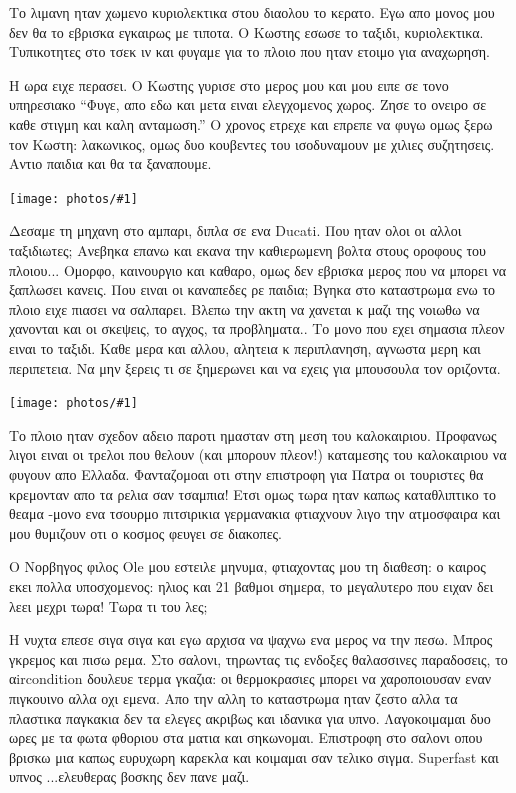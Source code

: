 \documentclass[11pt, letterpaper]{book}
\newcommand\photo[1]{\begin{center}\noindent\texttt{[image: photos/\#1]}\end{center}}
\begin{document}
Το λιμανη ηταν χωμενο κυριολεκτικα στου διαολου το κερατο. Εγω απο μονος μου δεν θα το εβρισκα εγκαιρως με τιποτα. Ο Κωστης εσωσε το ταξιδι, κυριολεκτικα. Τυπικοτητες στο τσεκ ιν και φυγαμε για το πλοιο που ηταν ετοιμο για αναχωρηση.

Η ωρα ειχε περασει. Ο Κωστης γυρισε στο μερος μου και μου ειπε σε τονο υπηρεσιακο ``Φυγε, απο εδω και μετα ειναι ελεγχομενος χωρος. Ζησε το ονειρο σε καθε στιγμη και καλη ανταμωση.'' Ο χρονος ετρεχε και επρεπε να φυγω ομως ξερω τον Κωστη: λακωνικος, ομως δυο κουβεντες του ισοδυναμουν με χιλιες συζητησεις. Αντιο παιδια και θα τα ξαναπουμε.

\photo{3.jpg}

Δεσαμε τη μηχανη στο αμπαρι, διπλα σε ενα Ducati. Που ηταν ολοι οι αλλοι ταξιδιωτες; Ανεβηκα επανω και εκανα την καθιερωμενη βολτα στους οροφους του πλοιου...  Ομορφο, καινουργιο και καθαρο, ομως δεν εβρισκα μερος που να μπορει να ξαπλωσει κανεις. Που ειναι οι καναπεδες ρε παιδια; Βγηκα στο καταστρωμα ενω το πλοιο ειχε πιασει να σαλπαρει. Βλεπω την ακτη να χανεται κ μαζι της νοιωθω να χανονται και οι σκεψεις, το αγχος, τα προβληματα.. Το μονο που εχει σημασια πλεον ειναι το ταξιδι. Καθε μερα και αλλου, αλητεια κ περιπλανηση, αγνωστα μερη και περιπετεια. Να μην ξερεις τι σε ξημερωνει και να εχεις για μπουσουλα τον οριζοντα.

\photo{4.jpg}

Tο πλοιο ηταν σχεδον αδειο παροτι ημασταν στη μεση του καλοκαιριου. Προφανως λιγοι ειναι οι τρελοι που θελουν (και μπορουν πλεον!) καταμεσης του καλοκαιριου να φυγουν απο Ελλαδα. Φανταζομοαι οτι στην επιστροφη για Πατρα οι τουριστες θα κρεμονταν απο τα ρελια σαν τσαμπια! Ετσι ομως τωρα ηταν καπως καταθλιπτικο το θεαμα -μονο ενα τσουρμο πιτσιρικια γερμανακια φτιαχνουν λιγο την ατμοσφαιρα και μου θυμιζουν οτι ο κοσμος φευγει σε διακοπες.

Ο Νορβηγος φιλος Ole μου εστειλε μηνυμα, φτιαχοντας μου τη διαθεση: ο καιρος εκει πολλα υποσχομενος: ηλιος και 21 βαθμοι σημερα, το μεγαλυτερο που ειχαν δει λεει μεχρι τωρα! Τωρα τι του λες;

Η νυχτα επεσε σιγα σιγα και εγω αρχισα να ψαχνω ενα μερος να την πεσω. Μπρος γκρεμος και πισω ρεμα. Στο σαλονι, τηρωντας τις ενδοξες θαλασσινες παραδοσεις, το αircondition δουλευε τερμα γκαζια: οι θερμοκρασιες μπορει να χαροποιουσαν εναν πιγκουινο αλλα οχι εμενα. Απο την αλλη το καταστρωμα ηταν ζεστο αλλα τα πλαστικα παγκακια δεν τα ελεγες ακριβως και ιδανικα για υπνο. Λαγοκοιμαμαι δυο ωρες με τα φωτα φθοριου στα ματια και σηκωνομαι. Επιστροφη στο σαλονι οπου βρισκω μια καπως ευρυχωρη καρεκλα και κοιμαμαι σαν τελικο σιγμα. Superfast και υπνος ...ελευθερας βοσκης δεν πανε μαζι. 
\end{document}
